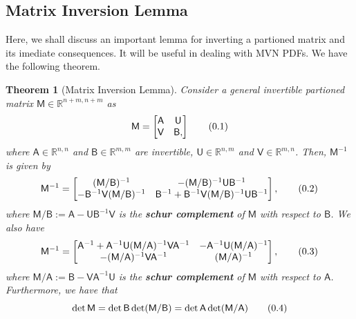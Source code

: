 \documentclass[10pt]{article}
\newtheorem{thm}{Theorem}[section]
\theoremstyle{definition}
\theoremstyle{definition}
\theoremstyle{remark}
\newcommand\eqnum{\addtocounter{equation}{1}\tag{\arabic{section}.\arabic{equation}}}
\begin{document}
\subsection{Matrix Inversion Lemma}
Here, we shall discuss an important lemma for inverting a partioned matrix and its imediate consequences. It will be useful in dealing with MVN PDFs. We have the following theorem.
\begin{thm}[Matrix Inversion Lemma]\label{thm:MIL}
Consider a general invertible partioned matrix $\mathsf{M}\in\mathbb{R}^{n+m,n+m}$ as
\begin{equation*}
\mathsf{M} =
\begin{bmatrix}
\mathsf{A} & \mathsf{U} \\
\mathsf{V} & \mathsf{B},
\end{bmatrix}
\eqnum
\end{equation*}
where $\mathsf{A}\in\mathbb{R}^{n, n}$ and $\mathsf{B}\in\mathbb{R}^{m,m}$ are invertible, $\mathsf{U}\in\mathbb{R}^{n,m}$ and $\mathsf{V}\in\mathbb{R}^{m,n}$. Then, $\mathsf{M}^{-1}$ is given by
\begin{equation*}
\mathsf{M}^{-1} =
\begin{bmatrix}
(\mathsf{M}/\mathsf{B})^{-1} & 
-(\mathsf{M}/\mathsf{B})^{-1}\mathsf{U}\mathsf{B}^{-1} \\
-\mathsf{B}^{-1}\mathsf{V}(\mathsf{M}/\mathsf{B})^{-1} & 
\mathsf{B}^{-1}+\mathsf{B}^{-1}\mathsf{V}(\mathsf{M}/\mathsf{B})^{-1}\mathsf{U}\mathsf{B}^{-1}
\end{bmatrix},
\eqnum
\label{eq:schur:MB}
\end{equation*}
where $\mathsf{M}/\mathsf{B}:=\mathsf{A}-\mathsf{U}\mathsf{B}^{-1}\mathsf{V}$ is the \textbf{schur complement} of $\mathsf{M}$ with respect to $\mathsf{B}$. We also have
\begin{equation*}
\mathsf{M}^{-1} =
\begin{bmatrix}
\mathsf{A}^{-1}+\mathsf{A}^{-1}\mathsf{U}(\mathsf{M}/\mathsf{A})^{-1}\mathsf{V}\mathsf{A}^{-1} & 
-\mathsf{A}^{-1}\mathsf{U} (\mathsf{M}/\mathsf{A})^{-1} \\
-(\mathsf{M}/\mathsf{A})^{-1}\mathsf{V}\mathsf{A}^{-1} & 
(\mathsf{M}/\mathsf{A})^{-1} 
\end{bmatrix},
\eqnum
\label{eq:schur:MA}
\end{equation*}
where $\mathsf{M}/\mathsf{A}:=\mathsf{B}-\mathsf{V}\mathsf{A}^{-1}\mathsf{U}$ is the \textbf{schur complement} of $\mathsf{M}$ with respect to $\mathsf{A}$. Furthermore, we have that
\begin{equation*}
\det\mathsf{M} = \det\mathsf{B}\det(\mathsf{M}/\mathsf{B})= \det\mathsf{A}\det(\mathsf{M}/\mathsf{A})
\eqnum
\label{eq:schur:det}
\end{equation*}
\end{thm}
\end{document}
